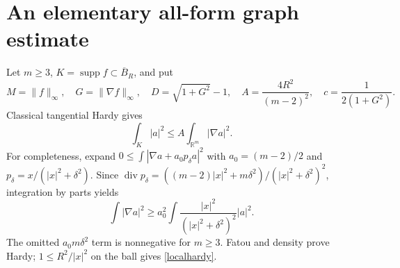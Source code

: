 \documentclass[11pt]{article}
\newcommand{\R}{\mathbb R}
\begin{document}
\section{An elementary all-form graph estimate}\label{hardy}
Let $m\ge3$, $K=\operatorname{supp}f\subset\overline B_R$, and put
\[
 M=\|f\|_\infty,\quad G=\|\nabla f\|_\infty,\quad
 D=\sqrt{1+G^2}-1,\quad A=\frac{4R^2}{(m-2)^2},\quad
 c=\frac1{2(1+G^2)}.
\]
Classical tangential Hardy gives
\begin{equation}\label{localhardy}
 \int_K|a|^2\le A\int_{\R^m}|\nabla a|^2.
\end{equation}
For completeness, expand
$0\le\int|\nabla a+a_0p_\delta a|^2$ with
$a_0=(m-2)/2$ and $p_\delta=x/(|x|^2+\delta^2)$.
Since $\operatorname{div}p_\delta=((m-2)|x|^2+m\delta^2)/
(|x|^2+\delta^2)^2$, integration by parts yields
\[
 \int|\nabla a|^2\ge a_0^2\int
   \frac{|x|^2}{(|x|^2+\delta^2)^2}|a|^2.
\]
The omitted $a_0m\delta^2$ term is nonnegative for $m\ge3$.
Fatou and density prove Hardy; $1\le R^2/|x|^2$ on the ball gives
\eqref{localhardy}.
\end{document}
